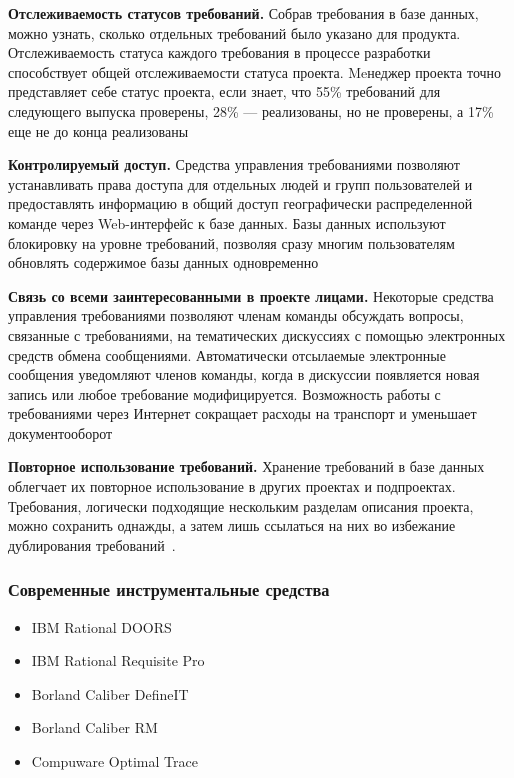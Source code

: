 \documentclass{../industrial-development}
\begin{document}
\textbf{Отслеживаемость статусов требований.} 
Собрав требования в базе данных, можно узнать, сколько отдельных требований было указано для продукта. Отслеживаемость статуса каждого требования в процессе разработки способствует общей отслеживаемости статуса проекта. Meнеджер проекта точно представляет себе статус проекта, если знает, что 55\% требований для следующего выпуска проверены, 28\% — реализованы, но не проверены, а 17\% еще не до конца реализованы

\textbf{Контролируемый доступ.} 
Средства управления требованиями позволяют  устанавливать права доступа для отдельных людей и групп пользователей и предоставлять информацию в общий доступ географически распределенной команде через Web-интерфейс к базе данных. Базы данных используют блокировку на уровне требований, позволяя сразу многим пользователям обновлять содержимое базы данных одновременно

\textbf{Связь со всеми заинтересованными в проекте лицами.} 
Некоторые средства управления требованиями позволяют членам команды обсуждать вопросы, связанные с требованиями, на тематических дискуссиях с помощью электронных средств обмена сообщениями. Автоматически отсылаемые электронные сообщения уведомляют членов команды, когда в дискуссии появляется новая запись или любое требование модифицируется. Возможность работы с требованиями через Интернет сокращает расходы на транспорт и уменьшает документооборот

\textbf{Повторное использование требований.} 
Хранение требований в базе данных облегчает их повторное использование в других проектах и подпроектах. Требования, логически подходящие нескольким разделам описания проекта, можно сохранить однажды, а затем лишь ссылаться на них во избежание дублирования требований~\cite[с.~403--404]{Wiegers}.



\begin{frame} \frametitle{Современные инструментальные средства}
	\begin{itemize}
\item IBM Rational DOORS
\item IBM Rational Requisite Pro
\item Borland Caliber DefineIT
\item Borland Caliber RM
\item Compuware Optimal Trace
  	\end{itemize}
\end{frame}

\lecturenotes
\end{document}
